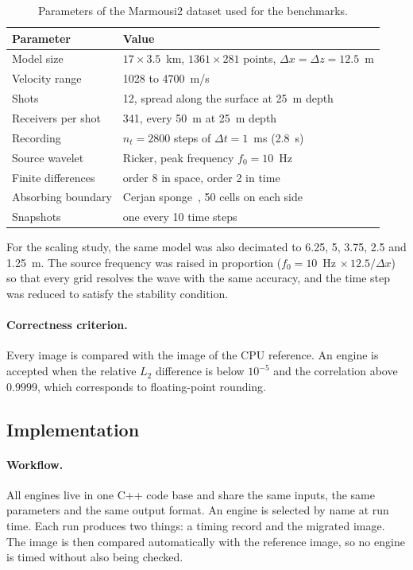 \documentclass[letterpaper,11pt,leqno]{article}
\begin{document}
\begin{table}[htbp]
\centering
\caption{Parameters of the Marmousi2 dataset used for the benchmarks.}
\label{tab:dataset}
\begin{tabular}{ll}
\toprule
Parameter              & Value \\
\midrule
Model size             & $17 \times 3.5$~km, $1361 \times 281$ points, $\Delta x = \Delta z = 12.5$~m \\
Velocity range         & 1028 to 4700~m/s \\
Shots                  & 12, spread along the surface at 25~m depth \\
Receivers per shot     & 341, every 50~m at 25~m depth \\
Recording              & $n_t = 2800$ steps of $\Delta t = 1$~ms (2.8~s) \\
Source wavelet         & Ricker, peak frequency $f_0 = 10$~Hz \\
Finite differences     & order 8 in space, order 2 in time \\
Absorbing boundary     & Cerjan sponge~\citep{Cerjan1985}, 50 cells on each side \\
Snapshots              & one every 10 time steps \\
\bottomrule
\end{tabular}
\end{table}

For the scaling study, the same model was also decimated to 6.25, 5, 3.75,
2.5 and 1.25~m. The source frequency was raised in proportion
($f_0 = 10$~Hz $\times\,12.5/\Delta x$) so that every grid resolves the wave with
the same accuracy, and the time step was reduced to satisfy the stability
condition.

\paragraph{Correctness criterion.}
Every image is compared with the image of the CPU reference. An engine is
accepted when the relative $L_2$ difference is below $10^{-5}$ and the
correlation above $0.9999$, which corresponds to floating-point rounding.


\subsection{Implementation}

\paragraph{Workflow.}
All engines live in one C++ code base and share the same inputs, the same
parameters and the same output format. An engine is selected by name at run
time. Each run produces two things: a timing record and the migrated image.
The image is then compared automatically with the reference image, so no
engine is timed without also being checked.
\end{document}
